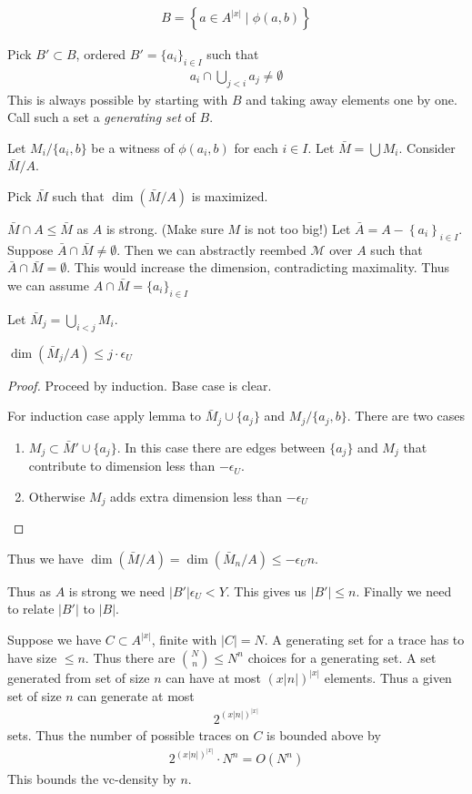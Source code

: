 \documentclass{amsart}
\newcommand{\M}{\mathcal M}
\newcommand{\curly}[1]{\left\{#1\right\}}
\begin{document}
\begin{align*}
	B = \curly{a \in A^{|x|} \mid \phi(a, b)}
\end{align*}

Pick $B' \subset B$, ordered $B' = \{a_i\}_{i \in I}$ such that
\begin{align*}
	a_i \cap \bigcup_{j < i} a_j \neq \emptyset
\end{align*}
This is always possible by starting with $B$ and taking away elements one by one.
Call such a set a \emph{generating set} of $B$.

Let $M_i / \{a_i, b\}$ be a witness of $\phi(a_i, b)$ for each $i \in I$.
Let $\bar M = \bigcup M_i$.
Consider $\bar M / A$.

Pick $\bar M$ such that $\dim(\bar M / A)$ is maximized.

$\bar M \cap A \leq \bar M$ as $A$ is strong. (Make sure $M$ is not too big!)
Let $\bar A = A - \curly{a_i}_{i \in I}$.
Suppose $\bar A \cap \bar M \neq \emptyset$.
Then we can abstractly reembed $\M$ over $A$ such that $\bar A \cap \bar M = \emptyset$.
This would increase the dimension, contradicting maximality.
Thus we can assume $A \cap \bar M = \{a_i\}_{i \in I}$

Let $\bar M_j = \bigcup_{i < j} M_i$.

\begin{Lemma}
	$\dim(\bar M_j / A) \leq j \cdot \epsilon_U$
\end{Lemma}
\begin{proof}
	Proceed by induction.
	Base case is clear.

	For induction case apply lemma to $\bar M_j \cup \{a_j\}$ and $M_j / \{a_j, b\}$.
	There are two cases
	\begin{enumerate}
		\item $M_j \subset \bar M' \cup \{a_j\}$.
		In this case there are edges between $\{a_j\}$ and $M_j$ that contribute to dimension less than $-\epsilon_U$.
		\item Otherwise $M_j$ adds extra dimension less than $-\epsilon_U$
	\end{enumerate}
\end{proof}

Thus we have $\dim(\bar M / A) = \dim(\bar M_n / A) \leq -\epsilon_U n$.

Thus as $A$ is strong we need $|B'| \epsilon_U < Y$.
This gives us $|B'| \leq n$.
Finally we need to relate $|B'|$ to $|B|$.

Suppose we have $C \subset A^{|x|}$, finite with $|C| = N$.
A generating set for a trace has to have size $\leq n$.
Thus there are ${N \choose n} \leq N^n$ choices for a generating set.
A set generated from set of size $n$ can have at most $(x|n|)^{|x|}$ elements.
Thus a given set of size $n$ can generate at most
\begin{align*}
	2^{(x|n|)^{|x|}}
\end{align*}
sets.
Thus the number of possible traces on $C$ is bounded above by
\begin{align*}
  2^{(x|n|)^{|x|}} \cdot N^n = O(N^n)
\end{align*}
This bounds the vc-density by $n$.
\end{document}
